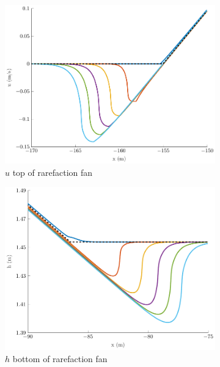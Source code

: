 \documentclass[10pt]{article}
\begin{document}
\begin{figure}
\begin{subfigure}{0.32\textwidth}
		\centering
		\includegraphics[width=\textwidth]{./Figures/Simulations/Study/RegSWWE/Convergence/uRFtop.pdf}
		\caption{$u$ top of rarefaction fan}
	\end{subfigure}
	\begin{subfigure}{0.32\textwidth}
	\centering
	\includegraphics[width=\textwidth]{./Figures/Simulations/Study/RegSWWE/Convergence/hRFBot.pdf}
	\caption{$h$ bottom of rarefaction fan}
	\end{subfigure}
	\begin{subfigure}{0.32\textwidth}
	\centering

\end{subfigure}
\end{figure}
\end{document}
